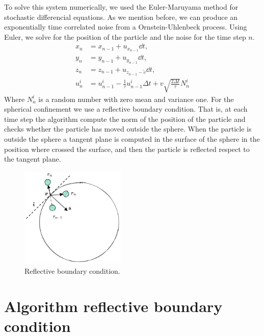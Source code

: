 \documentclass[%
10pt,
superscriptaddress,
twocolumn,
 amsmath,amssymb,
 aps,prx,
]{revtex4-2}
\begin{document}
To solve this system numerically, we used the Euler-Maruyama method for stochastic differencial equations.
As we mention before, we can produce an exponentially time correlated noise from a Ornstein-Uhlenbeck process.
Using Euler, we solve for the position of the particle and the noise for the time step $n$.
\begin{align}
   \label{eq:Euler_method}
   x_n&=x_{n-1}+u_{x_{n-1}}\dd t,\\
   y_n&=y_{n-1}+u_{y_{n-1}}\dd t,\\
   z_n&=z_{n-1}+u_{z_{n-1}-\tilde{v}}\dd t,\\
   u^i_{n}&=u^i_{n-1}-\frac{1}{\tau}u^i_{n-1}\Delta t+v\sqrt{\frac{2\Delta t}{\tau}}N^i_{n}
\end{align}
Where $N^{i}_n$ is a random number with zero mean and variance one. For the spherical confinement we use a reflective boundary condition. 
That is, at each time step the algorithm compute the norm of the position of the particle and checks whether the particle has moved outside the sphere. 
When the particle is outside the sphere a tangent plane is computed in the surface of the sphere in the position where crossed the surface, and then the particle is reflected respect to the tangent plane. 
\begin{figure}[!h]
  \includegraphics[width=5cm]{ReflectiveBoundary.png}
  \caption{
  Reflective boundary condition.
  }
  \label{fig:reflective_boundary}
\end{figure}
\label{Reflective.Boundary.condition}
    \section{Algorithm reflective boundary condition}
\end{document}
